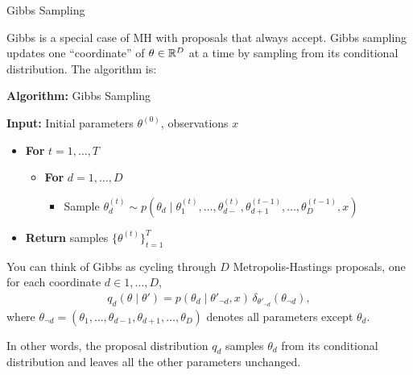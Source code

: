\documentclass[aspectratio=169]{beamer}
\begin{document}
\begin{frame}[t,allowframebreaks]{Gibbs Sampling}\label{gibbs-sampling}

Gibbs is a special case of MH with proposals that always accept. Gibbs
sampling updates one ``coordinate'' of \(\theta \in \mathbb{R}^D\) at a time
by sampling from its conditional distribution. The algorithm is:

\textbf{Algorithm:} Gibbs Sampling

\textbf{Input:} Initial parameters \(\theta^{(0)}\), observations \(x\)

{
\begin{itemize}
\item
  \textbf{For} \(t=1,\ldots, T\)

  \begin{itemize}
  \item
    \textbf{For} \(d=1,\ldots, D\)

    \begin{itemize}
    \item
      Sample
      \(\theta_d^{(t)} \sim p(\theta_d \mid \theta_{1}^{(t)}, \ldots, \theta_{d-}^{(t)}, \theta_{d+1}^{(t-1)}, \ldots, \theta_D^{(t-1)}, x)\)
    \end{itemize}
  \end{itemize}
  \item \textbf{Return} samples \(\{\theta^{(t)}\}_{t=1}^T\) 
\end{itemize}

}

You can think of Gibbs as cycling through \(D\) Metropolis-Hastings
proposals, one for each coordinate \(d \in 1,\ldots,D\), \begin{align*}
q_d(\theta \mid \theta') = p(\theta_d \mid \theta'_{\neg d}, x) \, \delta_{\theta'_{\neg d}}(\theta_{\neg d}),
\end{align*} where
\(\theta_{\neg d} = (\theta_1, \ldots, \theta_{d-1}, \theta_{d+1}, \ldots, \theta_D)\)
denotes all parameters except \(\theta_d\).

In other words, the proposal distribution \(q_d\) samples \(\theta_d\)
from its conditional distribution and leaves all the other parameters
unchanged.


\end{frame}
\end{document}
